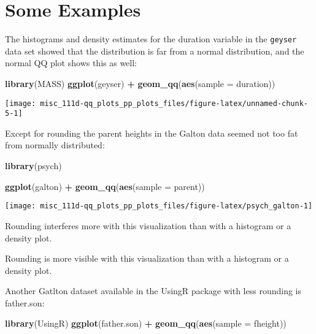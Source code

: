 \documentclass[]{book}
\newenvironment{Shaded}{\begin{snugshade}}{\end{snugshade}}
\newcommand{\DataTypeTok}[1]{\textcolor[rgb]{0.13,0.29,0.53}{#1}}
\newcommand{\KeywordTok}[1]{\textcolor[rgb]{0.13,0.29,0.53}{\textbf{#1}}}
\newcommand{\NormalTok}[1]{#1}
\newcommand{\OperatorTok}[1]{\textcolor[rgb]{0.81,0.36,0.00}{\textbf{#1}}}
\newcommand{\StringTok}[1]{\textcolor[rgb]{0.31,0.60,0.02}{#1}}
\begin{document}
\hypertarget{some-examples}{%
\section{Some Examples}\label{some-examples}}

The histograms and density estimates for the duration variable in the \texttt{geyser} data set showed that the distribution is far from a normal distribution, and the normal QQ plot shows this as well:

\begin{Shaded}
\begin{Highlighting}[]
\KeywordTok{library}\NormalTok{(MASS)}
\KeywordTok{ggplot}\NormalTok{(geyser) }\OperatorTok{+}\StringTok{ }\KeywordTok{geom_qq}\NormalTok{(}\KeywordTok{aes}\NormalTok{(}\DataTypeTok{sample =}\NormalTok{ duration))}
\end{Highlighting}
\end{Shaded}

\begin{center}\texttt{[image: misc\_111d-qq\_plots\_pp\_plots\_files/figure-latex/unnamed-chunk-5-1]} \end{center}

Except for rounding the parent heights in the Galton data seemed not too fat from normally distributed:

\begin{Shaded}
\begin{Highlighting}[]
\KeywordTok{library}\NormalTok{(psych)}

\KeywordTok{ggplot}\NormalTok{(galton) }\OperatorTok{+}\StringTok{ }\KeywordTok{geom_qq}\NormalTok{(}\KeywordTok{aes}\NormalTok{(}\DataTypeTok{sample =}\NormalTok{ parent))}
\end{Highlighting}
\end{Shaded}

\begin{center}\texttt{[image: misc\_111d-qq\_plots\_pp\_plots\_files/figure-latex/psych\_galton-1]} \end{center}

Rounding interferes more with this visualization than with a histogram or a density plot.

Rounding is more visible with this visualization than with a histogram or a density plot.

Another Gatlton dataset available in the UsingR package with less rounding is father.son:

\begin{Shaded}
\begin{Highlighting}[]
\KeywordTok{library}\NormalTok{(UsingR)}
\KeywordTok{ggplot}\NormalTok{(father.son) }\OperatorTok{+}\StringTok{ }\KeywordTok{geom_qq}\NormalTok{(}\KeywordTok{aes}\NormalTok{(}\DataTypeTok{sample =}\NormalTok{ fheight))}
\end{Highlighting}
\end{Shaded}
\end{document}
